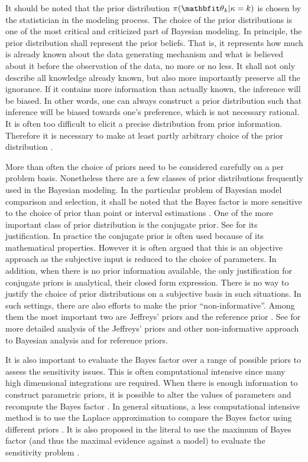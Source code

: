 It should be noted that the prior distribution $\pi(\bth_k|\kappa=k)$ is
chosen by the statistician in the modeling process. The choice of the prior
distributions is one of the most critical and criticized part of Bayesian
modeling. In principle, the prior distribution shall represent the prior
beliefs. That is, it represents how much is already known about the data
generating mechanism and what is believed about it before the observation of
the data, no more or no less. It shall not only describe all knowledge already
known, but also more importantly preserve all the ignorance. If it contains
more information than actually known, the inference will be biased. In other
words, one can always construct a prior distribution such that inference will
be biased towards one's preference, which is not necessary rational. It is
often too difficult to elicit a precise distribution from prior information.
Therefore it is necessary to make at least partly arbitrary choice of the
prior distribution \parencites{Robert2007}[][chap.~3]{Kass1995}.

More than often the choice of priors need to be considered carefully on a per
problem basis. Nonetheless there are a few classes of prior distributions
frequently used in the Bayesian modeling. In the particular problem of
Bayesian model comparison and selection, it shall be noted that the Bayes
factor is more sensitive to the choice of prior than point or interval
estimations \parencite{Kass1993, Kass1995}. One of the more important class of
prior distribution is the conjugate prior. See
\textcite[][chap.~5]{Bernardo2000} for its justification. In practice the
conjugate prior is often used because of its mathematical properties. However
it is often argued that this is an objective approach as the subjective input
is reduced to the choice of parameters. In addition, when there is no prior
information available, the only justification for conjugate priors is
analytical, their closed form expression. There is no way to justify the
choice of prior distributions on a subjective basis in such situations. In
such settings, there are also efforts to make the prior ``non-informative''.
Among them the most important two are Jeffreys' priors
\parencite{Jeffreys1946} and the reference prior \parencite{Bernardo1979}. See
\textcite{Kass1996} for more detailed analysis of the Jeffreys' priors and
other non-informative approach to Bayesian analysis and \textcite{Berger1989,
  Berger1992, Berger1992a} for reference priors.

It is also important to evaluate the Bayes factor over a range of possible
priors to assess the sensitivity issues. This is often computational intensive
since many high dimensional integrations are required. When there is enough
information to construct parametric priors, it is possible to alter the values
of parameters and recompute the Bayes factor
\parencite[e.g.,][]{McCulloch1991}. In general situations, a less
computational intensive method is to use the Laplace approximation to compare
the Bayes factor using different priors \parencite[e.g.,][]{Kass1992}. It is
also proposed in the literal to use the maximum of Bayes factor (and thus the
maximal evidence against a model) to evaluate the sensitivity problem
\parencite[e.g.,][]{Berger1987}.

